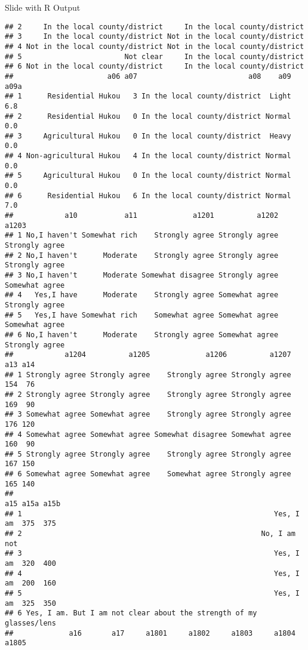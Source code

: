 \documentclass[
  ignorenonframetext,
]{beamer}
\begin{document}
\begin{frame}[fragile]{Slide with R Output}
\begin{verbatim}
## 2     In the local county/district     In the local county/district
## 3     In the local county/district Not in the local county/district
## 4 Not in the local county/district Not in the local county/district
## 5                        Not clear     In the local county/district
## 6 Not in the local county/district     In the local county/district
##                      a06 a07                          a08    a09 a09a
## 1      Residential Hukou   3 In the local county/district  Light  6.8
## 2      Residential Hukou   0 In the local county/district Normal  0.0
## 3     Agricultural Hukou   0 In the local county/district  Heavy  0.0
## 4 Non-agricultural Hukou   4 In the local county/district Normal  0.0
## 5     Agricultural Hukou   0 In the local county/district Normal  0.0
## 6      Residential Hukou   6 In the local county/district Normal  7.0
##            a10           a11             a1201          a1202          a1203
## 1 No,I haven't Somewhat rich    Strongly agree Strongly agree Strongly agree
## 2 No,I haven't      Moderate    Strongly agree Strongly agree Strongly agree
## 3 No,I haven't      Moderate Somewhat disagree Strongly agree Somewhat agree
## 4   Yes,I have      Moderate    Strongly agree Somewhat agree Strongly agree
## 5   Yes,I have Somewhat rich    Somewhat agree Somewhat agree Somewhat agree
## 6 No,I haven't      Moderate    Strongly agree Somewhat agree Strongly agree
##            a1204          a1205             a1206          a1207 a13 a14
## 1 Strongly agree Strongly agree    Strongly agree Strongly agree 154  76
## 2 Strongly agree Strongly agree    Strongly agree Strongly agree 169  90
## 3 Somewhat agree Somewhat agree    Strongly agree Strongly agree 176 120
## 4 Somewhat agree Somewhat agree Somewhat disagree Somewhat agree 160  90
## 5 Strongly agree Strongly agree    Strongly agree Strongly agree 167 150
## 6 Somewhat agree Somewhat agree    Somewhat agree Strongly agree 165 140
##                                                                   a15 a15a a15b
## 1                                                           Yes, I am  375  375
## 2                                                        No, I am not          
## 3                                                           Yes, I am  320  400
## 4                                                           Yes, I am  200  160
## 5                                                           Yes, I am  325  350
## 6 Yes, I am. But I am not clear about the strength of my glasses/lens          
##             a16       a17     a1801     a1802     a1803     a1804     a1805

\end{verbatim}
\end{frame}
\end{document}
